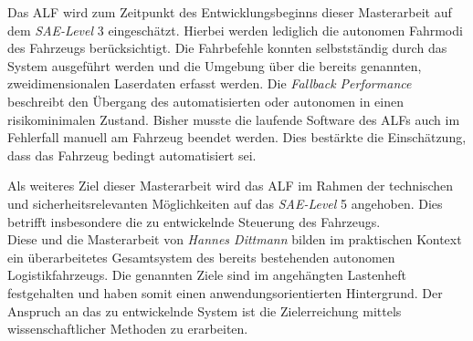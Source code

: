 		Das ALF wird zum Zeitpunkt des Entwicklungsbeginns dieser Masterarbeit auf dem \textit{SAE-Level} 3 eingeschätzt. Hierbei werden lediglich die autonomen Fahrmodi des Fahrzeugs berücksichtigt. Die Fahrbefehle konnten selbstständig durch das System ausgeführt werden und die Umgebung über die bereits genannten, zweidimensionalen Laserdaten erfasst werden. Die \textit{Fallback Performance} beschreibt den Übergang des automatisierten oder autonomen in einen risikominimalen Zustand. Bisher musste die laufende Software des ALFs auch im Fehlerfall manuell am Fahrzeug beendet werden. Dies bestärkte die Einschätzung, dass das Fahrzeug bedingt automatisiert sei.	
		
		
		
		Als weiteres Ziel dieser Masterarbeit wird das ALF im Rahmen der technischen und sicherheitsrelevanten Möglichkeiten auf das \textit{SAE-Level} 5 angehoben. Dies betrifft insbesondere die zu entwickelnde Steuerung des Fahrzeugs.\\
		
		Diese und die Masterarbeit von \textit{Hannes Dittmann} bilden im praktischen Kontext ein überarbeitetes Gesamtsystem des bereits bestehenden autonomen Logistikfahrzeugs. Die genannten Ziele sind im angehängten Lastenheft festgehalten und haben somit einen anwendungsorientierten Hintergrund. Der Anspruch an das zu entwickelnde System ist die Zielerreichung mittels wissenschaftlicher Methoden zu erarbeiten.  
		
		
	